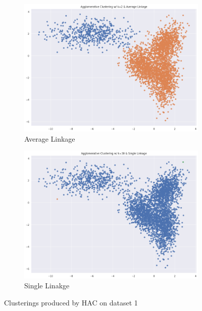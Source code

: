 \documentclass[12pt]{article}
\begin{document}
\begin{figure}[ht]
  \centering
  \begin{subfigure}{0.45\textwidth}
    \centering
    \includegraphics[width=\linewidth]{21.png}
    \caption{Average Linkage}
    \label{fig:21}
  \end{subfigure}%
  \vspace{1em} %
  \begin{subfigure}{0.45\textwidth}
    \centering
    \includegraphics[width=\linewidth]{f.png}
    \caption{Single Linakge}
    \label{fig:22}
  \end{subfigure}%
  \caption{Clusterings produced by HAC on dataset 1}
  \label{fig:dist_3}
\end{figure}
\end{document}
